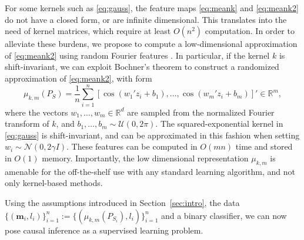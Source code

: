 \documentclass[twoside,11pt,a4paper]{article}
\begin{document}
For some kernels such as \eqref{eq:gauss}, the feature maps \eqref{eq:meank}
and \eqref{eq:meank2} do not have a closed form, or are infinite dimensional.
This translates into the need of kernel matrices, which require at least
$O(n^2)$ computation. In order to alleviate these burdens, we propose to
compute a low-dimensional approximation of \eqref{eq:meank2} using random
Fourier features \citep{Rahimi07}. In particular, if the kernel $k$ is
shift-invariant, we can exploit Bochner's theorem \citep{Rudin62} to construct
a randomized approximation of \eqref{eq:meank2}, with form
\begin{equation}\label{eq:meank3}
  {\mu}_{k,m}(P_S) = \frac{1}{n} \sum_{i=1}^n \left[ \cos(w_1'
  z_i + b_1), \ldots, \cos(w_m' z_i + b_m)\right]' \in
  \mathbb{R}^m,
\end{equation}
where the vectors $w_1, \ldots, w_m \in \mathbb{R}^d$ are sampled from the normalized Fourier
transform of $k$, and $b_1, \ldots, b_m \sim \mathcal{U}(0, 2\pi)$. The
squared-exponential kernel in \eqref{eq:gauss} is shift-invariant, and can be
approximated in this fashion when setting $w_i \sim \mathcal{N}(0,
2\gamma I)$.  These features can be computed in $O(mn)$ time and stored in
$O(1)$ memory. Importantly, the low dimensional representation
${\mu}_{k,m}$ is amenable for the off-the-shelf use with any standard
learning algorithm, and not only kernel-based methods.

Using the assumptions introduced in Section~\ref{sec:intro}, the data
$\{(\mathbf{m}_i,l_i)\}_{i=1}^n := \{(\mu_{k,m}(P_{S_i}),l_i)\}_{i=1}^n$ and a binary
classifier, we can now pose causal inference as a supervised learning problem.
\end{document}
